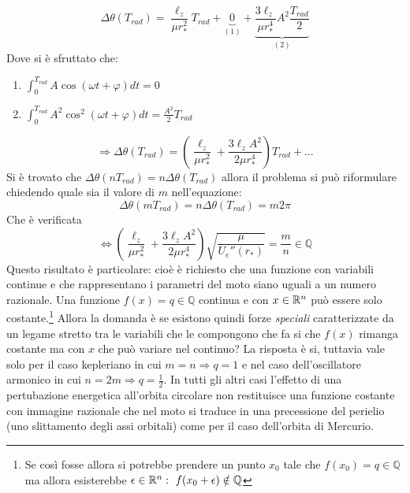 \documentclass[Main.tex]{subfiles}
\begin{document}
\begin{equation}
	\Delta \theta ( T_{rad} ) = \frac{\ell_z}{\mu r_*^2} T_{rad} + \underbrace{0}_{(1)} + \underbrace{\frac{3 \ell_z}{\mu r_*^4}A^2 \frac{T_{rad}}{2}}_{(2)}
\end{equation}
Dove si è sfruttato che:
\begin{enumerate}
	\item $\int_0^{T_{rad}} A \cos (\omega t + \varphi) dt=0$
	\item $\int_0^{T_{rad}} A^2 \cos ^2 ( \omega t + \varphi) dt = \frac{A^2}{2} T_{rad}$
\end{enumerate}

\begin{equation}
	\Rightarrow \Delta \theta (T_{rad}) = \left( \frac{\ell_z}{\mu r_*^2} + \frac{3 \ell_z A^2}{2 \mu r_*^4} \right) T_{rad} + ... 
\end{equation}
Si è trovato che $\Delta \theta ( n T_{rad} ) = n \Delta \theta ( T_{rad} )$ allora il problema si può riformulare chiedendo quale sia il valore di $m$ nell'equazione:
\begin{equation}
	\Delta \theta (m T_{rad} ) = n \Delta \theta ( T_{rad}) = m 2 \pi
\end{equation}
Che è verificata 
\begin{equation}
	\iff \left( \frac{\ell_z}{\mu r_*^2} + \frac{3 \ell_z A^2}{2 \mu r_*^4} \right) \sqrt{\frac{ \mu}{U_e''(r_*)}} = \frac{m}{n} \in \mathbb{Q}
\end{equation}
Questo risultato è particolare: cioè è richiesto che una funzione con variabili continue e che rappresentano i parametri del moto siano uguali a un numero razionale. Una funzione $f(x)=q \in \mathbb{Q}$ continua e con $x \in \mathbb{R}^n$ può essere solo costante.\footnote{Se così fosse allora si potrebbe prendere un punto $x_0$ tale che $f(x_0)=q \in \mathbb{Q}$ ma allora esisterebbe $\epsilon \in \Rr^n : \ f(x_0 + \epsilon) \notin \mathbb{Q}$} Allora la domanda è se esistono quindi forze \emph{speciali} caratterizzate da un legame stretto tra le variabili che le compongono che fa si che $f(x)$ rimanga costante ma con $x$ che può variare nel continuo? La risposta è si, tuttavia vale solo per il caso kepleriano in cui $m=n \Rightarrow q=1$ e nel caso dell'oscillatore armonico in cui $n=2m \Rightarrow q= \frac{1}{2}$. In tutti gli altri casi l'effetto di una pertubazione energetica all'orbita circolare non restituisce una funzione costante con immagine razionale che nel moto si traduce in una precessione del perielio (uno slittamento degli assi orbitali) come per il caso dell'orbita di Mercurio.
\end{document}
